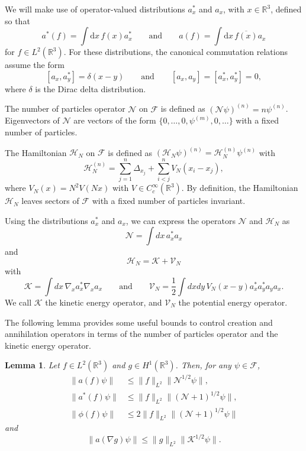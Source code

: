 \documentclass[11pt,a4paper]{scrartcl}
\newtheorem{lem}[thm]{Lemma}
\newcommand{\R}{\mathds{R}}
\newcommand{\N}{\mathcal{N}}
\newcommand{\K}{\mathcal{K}}
\newcommand{\di}{\textrm{d}}		%
\newcommand{\Ncal}{\mathcal{N}}		%
\newcommand{\Kcal}{\mathcal{K}}		%
\newcommand{\Hcal}{\mathcal{H}}		%
\newcommand{\cc}[1]{\overline{#1}}	%
\newcommand{\norm}[1]{\lVert#1\rVert}	%
\newcommand{\be}[1]{\begin{equation}\label{eq:#1}}	%
\newcommand{\ee}{\end{equation}}
\begin{document}
We will make use of operator-valued distributions $a_x^*$ and $a_x$, with $x
\in \R^3$, defined so that
\[
  a^*(f) = \int \di x\, f(x) a^*_x \qquad \text{and} \qquad a(f) = \int \di
  x\, \cc{f(x)} a_x
\]
for $f \in L^2(\R^3)$. For these distributions, the canonical commutation
relations assume the form
\[
  [a_x, a_y^*] = \delta(x-y) \qquad \text{and} \qquad [a_x, a_y] = [a_x^*,
  a_y^*] = 0,
\]
where $\delta$ is the Dirac delta distribution.


The number of particles operator $\mathcal{N}$ on $\mathcal{F}$ is defined as
$(\N \psi)^{(n)} = n \psi^{(n)}$. Eigenvectors of $\N$ are vectors of the form
$\{0, \dots, 0, \psi^{(m)}, 0, \dots \}$ with a fixed number of particles.


The Hamiltonian $\Hcal_N$ on $\mathcal{F}$ is defined as $(\Hcal_N
\psi)^{(n)} = \Hcal_N^{(n)} \psi^{(n)}$ with
\[
  \Hcal_N^{(n)} = \sum_{j=1}^n \Delta_{x_j} + \sum_{i<j}^n V_N(x_i - x_j),
\]
where $V_N(x) = N^2 V(Nx)$ with $V \in C_c^\infty(\R^3)$. By definition, the
Hamiltonian $\Hcal_N$ leaves sectors of $\mathcal{F}$ with a fixed number of
particles invariant.


Using the distributions $a_x^*$ and $a_x$, we can express the operators $\N$
and $\Hcal_N$ as
\[
  \N = \int dx \, a_x^* a_x
\]
and
\[
  \Hcal_N = \K + \mathcal{V}_N
\]
with
\[
  \K = \int dx \, \nabla_x a_x^* \nabla_x a_x \qquad \text{and} \qquad
  \mathcal{V}_N = \frac{1}{2} \int dx dy \, V_N(x-y) a_x^* a_y^* a_y a_x.
\]
We call $\K$ the kinetic energy operator, and $\mathcal{V}_N$ the potential
energy operator.


The following lemma provides some useful bounds to control creation and
annihilation operators in terms of the number of particles operator and the
kinetic energy operator.


\begin{lem} \label{l:a}
  Let $f \in L^2(\R^3)$ and $g \in H^1(\R^3)$. Then, for any $\psi \in
  \mathcal{F}$,
  \begin{equation} \label{aNorm}
    \begin{aligned}
      \norm{a(f)\psi} & \leq \norm{f}_{L^2} \norm{\Ncal^{1/2}\psi}, \\
      \norm{a^*(f)\psi} & \leq \norm{f}_{L^2} \norm{(\Ncal+1)^{1/2}\psi}, \\
      \norm{\phi(f) \psi} & \leq 2 \norm{f}_{L^2} \norm{(\N+1)^{1/2} \psi}
    \end{aligned}
  \end{equation}
and
\be{agradnorm}
\norm{a(\nabla g)\psi}  \leq \norm{g}_{L^2} \norm{\Kcal^{1/2}\psi}.
\ee
\end{lem}
\end{document}
